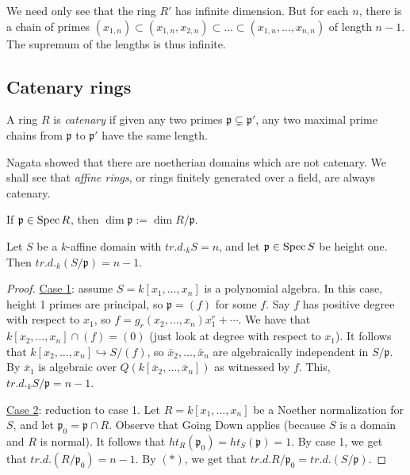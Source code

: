 We need only see that the ring $R'$ has infinite dimension. But for each $n$, there
is a chain of primes $(x_{1,n}) \subset (x_{1,n}, x_{2,n}) \subset
\dots \subset (x_{1,n}, \dots, x_{n,n})$ of length $n-1$. The supremum of the
lengths is thus infinite.

\subsection{Catenary rings}
 \begin{definition}
   A ring $R$ is \emph{catenary} if given any two primes $\mathfrak{p}\subsetneq \mathfrak{p}'$, any two
   maximal prime chains from $\mathfrak{p}$ to $\mathfrak{p}'$ have the same length.
 \end{definition}
 Nagata showed that there are noetherian domains which are not catenary. We
 shall see that \emph{affine rings}, or rings finitely generated over a field,
 are always catenary.

 \begin{definition}
   If $\mathfrak{p}\in \operatorname{Spec} R$, then $\dim \mathfrak{p}:= \dim R/\mathfrak{p}$.
 \end{definition}


\begin{lemma}
   Let $S$ be a $k$-affine domain with $tr.d._k S=n$, and let $\mathfrak{p}\in
	\operatorname{Spec} S$ be height one. Then
   $tr.d._k (S/\mathfrak{p})=n-1$.
 \end{lemma}
 \begin{proof}
   \underline{Case 1}: assume $S=k[x_1,\dots, x_n]$ is a polynomial algebra. In this
   case, height 1 primes are principal, so $\mathfrak{p}=(f)$ for some $f$. Say $f$ has positive
   degree with respect to $x_1$, so $f = g_r(x_2,\dots, x_n)x_1^r + \cdots$. We have
   that $k[x_2,\dots, x_n]\cap (f)=(0)$ (just look at degree with respect to $x_1$). It
   follows that $k[x_2,\dots, x_n]\hookrightarrow S/(f)$, so $\bar x_2,\dots, \bar x_n$
   are algebraically independent in $S/\mathfrak{p}$. By $\bar x_1$ is algebraic over $Q(k[\bar
   x_2,\dots, \bar x_n])$ as witnessed by $f$. This, $tr.d._k S/\mathfrak{p}=n-1$.

   \underline{Case 2}: reduction to case 1. Let $R=k[x_1,\dots, x_n]$ be a Noether
   normalization for $S$, and let $\mathfrak{p}_0=\mathfrak{p}\cap R$. Observe that Going Down applies
   (because $S$ is a domain and $R$ is normal). It follows that $ht_R(\mathfrak{p}_0)=ht_S(\mathfrak{p})=1$.
   By case 1, we get that $tr.d. (R/\mathfrak{p}_0)=n-1$. By $(\ast)$, we get that $tr.d.
   R/\mathfrak{p}_0=tr.d. (S/\mathfrak{p})$.
 \end{proof}


